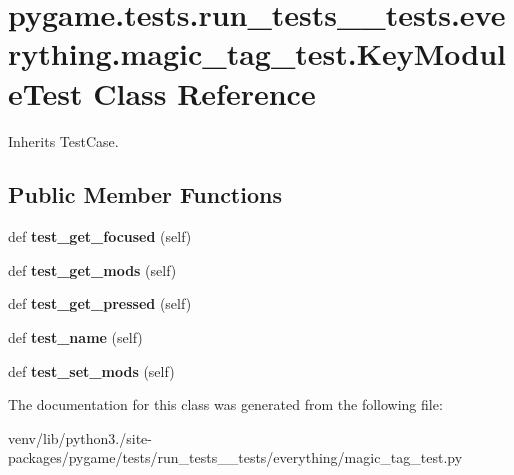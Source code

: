 \hypertarget{classpygame_1_1tests_1_1run__tests____tests_1_1everything_1_1magic__tag__test_1_1_key_module_test}{}\section{pygame.\+tests.\+run\+\_\+tests\+\_\+\+\_\+tests.\+everything.\+magic\+\_\+tag\+\_\+test.\+Key\+Module\+Test Class Reference}
\label{classpygame_1_1tests_1_1run__tests____tests_1_1everything_1_1magic__tag__test_1_1_key_module_test}


Inherits Test\+Case.

\subsection*{Public Member Functions}
\begin{DoxyCompactItemize}
\item 
\mbox{\label{classpygame_1_1tests_1_1run__tests____tests_1_1everything_1_1magic__tag__test_1_1_key_module_test_a9226f6671ece0e9541332c55132fedb8}} 
def {\bfseries test\+\_\+get\+\_\+focused} (self)
\item 
\mbox{\label{classpygame_1_1tests_1_1run__tests____tests_1_1everything_1_1magic__tag__test_1_1_key_module_test_a2ee6516a516884d51c755ce6c5a1c9dd}} 
def {\bfseries test\+\_\+get\+\_\+mods} (self)
\item 
\mbox{\label{classpygame_1_1tests_1_1run__tests____tests_1_1everything_1_1magic__tag__test_1_1_key_module_test_a53b144e487dcc81811bee45dd3dab893}} 
def {\bfseries test\+\_\+get\+\_\+pressed} (self)
\item 
\mbox{\label{classpygame_1_1tests_1_1run__tests____tests_1_1everything_1_1magic__tag__test_1_1_key_module_test_aefd8164c5e048eefe55d0f45bc6d6aac}} 
def {\bfseries test\+\_\+name} (self)
\item 
\mbox{\label{classpygame_1_1tests_1_1run__tests____tests_1_1everything_1_1magic__tag__test_1_1_key_module_test_ad4f3be7dfdb139f7e0538c33cb5dd836}} 
def {\bfseries test\+\_\+set\+\_\+mods} (self)
\end{DoxyCompactItemize}


The documentation for this class was generated from the following file\+:\begin{DoxyCompactItemize}
\item 
venv/lib/python3./site-\/packages/pygame/tests/run\+\_\+tests\+\_\+\+\_\+tests/everything/magic\+\_\+tag\+\_\+test.\+py\end{DoxyCompactItemize}
